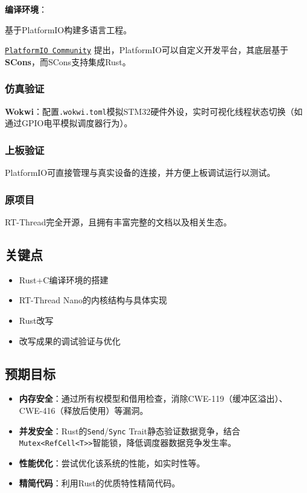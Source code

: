 \textbf{编译环境}：

基于PlatformIO构建多语言工程。

\href{https://community.platformio.org/t/support-for-different-languages-and-compilers/921}{\texttt{PlatformIO Community}} 提出，PlatformIO可以自定义开发平台，其底层基于\textbf{SCons}，而SCons支持集成Rust。

\subsubsection{仿真验证}

\textbf{Wokwi}：配置\texttt{.wokwi.toml}模拟STM32硬件外设，实时可视化线程状态切换（如通过GPIO电平模拟调度器行为）。


\subsubsection{上板验证}

PlatformIO可直接管理与真实设备的连接，并方便上板调试运行以测试。

\subsubsection{原项目}

RT-Thread完全开源，且拥有丰富完整的文档以及相关生态。

\subsection{关键点}

\begin{itemize}
    \item Rust+C编译环境的搭建
    \item RT-Thread Nano的内核结构与具体实现
    \item Rust改写
    \item 改写成果的调试验证与优化
\end{itemize}

\subsection{预期目标}

\begin{itemize}
    \item \textbf{内存安全}：通过所有权模型和借用检查，消除CWE-119（缓冲区溢出）、CWE-416（释放后使用）等漏洞。
    \item \textbf{并发安全}：Rust的\texttt{Send}/\texttt{Sync} Trait静态验证数据竞争，结合\texttt{Mutex<RefCell<T>>}智能锁，降低调度器数据竞争发生率。
    \item \textbf{性能优化}：尝试优化该系统的性能，如实时性等。
    \item \textbf{精简代码}：利用Rust的优质特性精简代码。
\end{itemize}